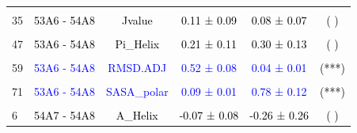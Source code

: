\documentclass{article}\usepackage[table]{xcolor}
\renewcommand{\$}{$} %
\begin{document}
\begin{center}
\begin{longtable}[t]{lccccc}
\cellcolor{gray!6}{29} & \cellcolor{gray!6}{\textcolor{blue}{53A6 - 54A8}} & \cellcolor{gray!6}{\textcolor{blue}{Hbond\_native\_bb\_0.25\_120}} & \cellcolor{gray!6}{\textcolor{blue}{-0.58 ± 0.08}} & \cellcolor{gray!6}{\textcolor{blue}{-2.40 ± 0.34}} & \cellcolor{gray!6}{\textcolor{black}{(***)}}\\
35 & \textcolor{black}{53A6 - 54A8} & \textcolor{black}{Jvalue} & \textcolor{black}{0.11 ± 0.09} & \textcolor{black}{0.08 ± 0.07} & \textcolor{black}{( )}\\
\cellcolor{gray!6}{41} & \cellcolor{gray!6}{\textcolor{black}{53A6 - 54A8}} & \cellcolor{gray!6}{\textcolor{black}{NOE\_repl\_merged}} & \cellcolor{gray!6}{\textcolor{black}{0.08 ± 0.04}} & \cellcolor{gray!6}{\textcolor{black}{0.00 ± 0.00}} & \cellcolor{gray!6}{\textcolor{black}{( )}}\\
47 & \textcolor{black}{53A6 - 54A8} & \textcolor{black}{Pi\_Helix} & \textcolor{black}{0.21 ± 0.11} & \textcolor{black}{0.30 ± 0.13} & \textcolor{black}{( )}\\
\cellcolor{gray!6}{53} & \cellcolor{gray!6}{\textcolor{black}{53A6 - 54A8}} & \cellcolor{gray!6}{\textcolor{black}{Rgyr}} & \cellcolor{gray!6}{\textcolor{black}{0.00 ± 0.00}} & \cellcolor{gray!6}{\textcolor{black}{0.01 ± 0.00}} & \cellcolor{gray!6}{\textcolor{black}{( )}}\\
59 & \textcolor{blue}{53A6 - 54A8} & \textcolor{blue}{RMSD.ADJ} & \textcolor{blue}{0.52 ± 0.08} & \textcolor{blue}{0.04 ± 0.01} & \textcolor{black}{(***)}\\
\cellcolor{gray!6}{65} & \cellcolor{gray!6}{\textcolor{black}{53A6 - 54A8}} & \cellcolor{gray!6}{\textcolor{black}{SASA\_nonpolar}} & \cellcolor{gray!6}{\textcolor{black}{0.00 ± 0.01}} & \cellcolor{gray!6}{\textcolor{black}{0.04 ± 0.09}} & \cellcolor{gray!6}{\textcolor{black}{( )}}\\
71 & \textcolor{blue}{53A6 - 54A8} & \textcolor{blue}{SASA\_polar} & \textcolor{blue}{0.09 ± 0.01} & \textcolor{blue}{0.78 ± 0.12} & \textcolor{black}{(***)}\\
\cellcolor{gray!6}{77} & \cellcolor{gray!6}{\textcolor{black}{53A6 - 54A8}} & \cellcolor{gray!6}{\textcolor{black}{ThreeTen\_Helix}} & \cellcolor{gray!6}{\textcolor{black}{-0.18 ± 0.08}} & \cellcolor{gray!6}{\textcolor{black}{-0.27 ± 0.11}} & \cellcolor{gray!6}{\textcolor{black}{( )}}\\
6 & \textcolor{black}{54A7 - 54A8} & \textcolor{black}{A\_Helix} & \textcolor{black}{-0.07 ± 0.08} & \textcolor{black}{-0.26 ± 0.26} & \textcolor{black}{( )}\\

\end{longtable}
\end{center}
\end{document}
